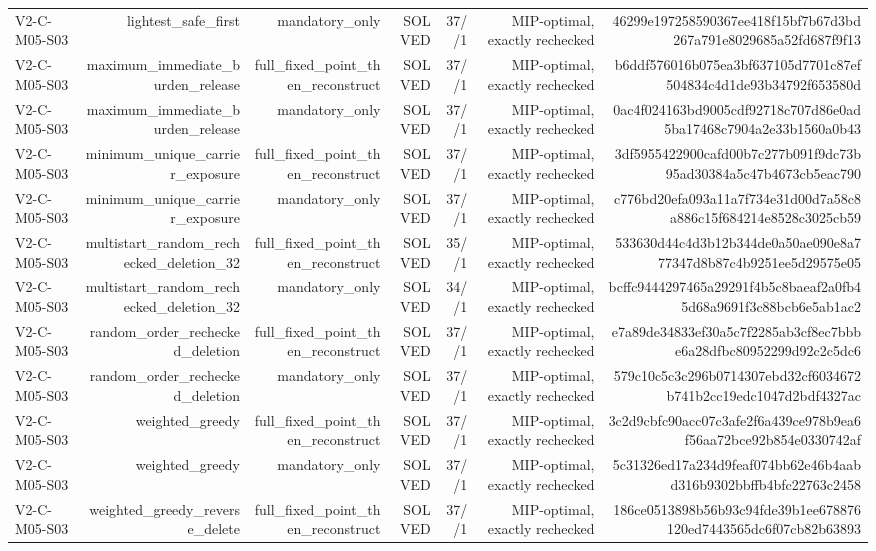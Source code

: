 {\begin{longtable}{lrrrrrr}
V2-C-M05-S03 & lightest\_safe\_first & mandatory\_only & SOLVED & 37//1 & MIP-optimal, exactly rechecked & 46299e197258590367ee418f15bf7b67d3bd267a791e8029685a52fd687f9f13 \\
V2-C-M05-S03 & maximum\_immediate\_burden\_release & full\_fixed\_point\_then\_reconstruct & SOLVED & 37//1 & MIP-optimal, exactly rechecked & b6ddf576016b075ea3bf637105d7701c87ef504834c4d1de93b34792f653580d \\
V2-C-M05-S03 & maximum\_immediate\_burden\_release & mandatory\_only & SOLVED & 37//1 & MIP-optimal, exactly rechecked & 0ac4f024163bd9005cdf92718c707d86e0ad5ba17468c7904a2e33b1560a0b43 \\
V2-C-M05-S03 & minimum\_unique\_carrier\_exposure & full\_fixed\_point\_then\_reconstruct & SOLVED & 37//1 & MIP-optimal, exactly rechecked & 3df5955422900cafd00b7c277b091f9dc73b95ad30384a5c47b4673cb5eac790 \\
V2-C-M05-S03 & minimum\_unique\_carrier\_exposure & mandatory\_only & SOLVED & 37//1 & MIP-optimal, exactly rechecked & c776bd20efa093a11a7f734e31d00d7a58c8a886c15f684214e8528c3025cb59 \\
V2-C-M05-S03 & multistart\_random\_rechecked\_deletion\_32 & full\_fixed\_point\_then\_reconstruct & SOLVED & 35//1 & MIP-optimal, exactly rechecked & 533630d44c4d3b12b344de0a50ae090e8a777347d8b87c4b9251ee5d29575e05 \\
V2-C-M05-S03 & multistart\_random\_rechecked\_deletion\_32 & mandatory\_only & SOLVED & 34//1 & MIP-optimal, exactly rechecked & bcffc9444297465a29291f4b5c8baeaf2a0fb45d68a9691f3c88bcb6e5ab1ac2 \\
V2-C-M05-S03 & random\_order\_rechecked\_deletion & full\_fixed\_point\_then\_reconstruct & SOLVED & 37//1 & MIP-optimal, exactly rechecked & e7a89de34833ef30a5c7f2285ab3cf8ec7bbbe6a28dfbc80952299d92c2c5dc6 \\
V2-C-M05-S03 & random\_order\_rechecked\_deletion & mandatory\_only & SOLVED & 37//1 & MIP-optimal, exactly rechecked & 579c10c5c3c296b0714307ebd32cf6034672b741b2cc19edc1047d2bdf4327ac \\
V2-C-M05-S03 & weighted\_greedy & full\_fixed\_point\_then\_reconstruct & SOLVED & 37//1 & MIP-optimal, exactly rechecked & 3c2d9cbfc90acc07c3afe2f6a439ce978b9ea6f56aa72bce92b854e0330742af \\
V2-C-M05-S03 & weighted\_greedy & mandatory\_only & SOLVED & 37//1 & MIP-optimal, exactly rechecked & 5c31326ed17a234d9feaf074bb62e46b4aabd316b9302bbffb4bfc22763c2458 \\
V2-C-M05-S03 & weighted\_greedy\_reverse\_delete & full\_fixed\_point\_then\_reconstruct & SOLVED & 37//1 & MIP-optimal, exactly rechecked & 186ce0513898b56b93c94fde39b1ee678876120ed7443565dc6f07cb82b63893 \\

\end{longtable}}
